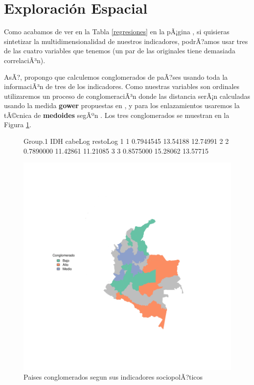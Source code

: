 \section{Exploración Espacial}\label{espacial}



Como acabamos de ver en la Tabla \ref{regresiones} en la pÃ¡gina \pageref{regresiones}, si quisieras sintetizar la multidimensionalidad de nuestros indicadores, podrÃ?amos usar tres de las cuatro variables que tenemos (un par de las originales tiene demasiada correlaciÃ³n). 

AsÃ?, propongo que calculemos conglomerados de paÃ?ses usando toda la informaciÃ³n de tres de los indicadores. Como nuestras variables son ordinales utilizaremos un proceso de conglomeraciÃ³n donde las distancia serÃ¡n calculadas usando la medida {\bf gower} propuestas en \cite{gower_general_1971}, y para los enlazamientos usaremos la tÃ©cnica de {\bf medoides} segÃºn \cite{reynolds_clustering_2006}. Los tres conglomerados se muestran en la Figura \ref{clustmap}.






\begin{figure}[h]
\centering
\begin{Schunk}
\begin{Soutput}
  Group.1       IDH  cabeLog restoLog
1       1 0.7944545 13.54188 12.74991
2       2 0.7890000 11.42861 11.21085
3       3 0.8575000 15.28062 13.57715
\end{Soutput}
\end{Schunk}
\includegraphics{espacial-plotMap1}

\caption{Paises conglomerados segun sus indicadores sociopolÃ?ticos}\label{clustmap}
\end{figure}


\endinput
